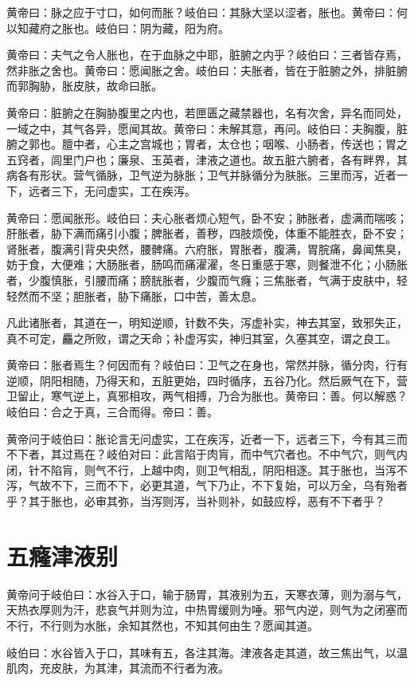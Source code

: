 \documentclass[a4paper,12pt,UTF8,twoside]{ctexbook}
\begin{document}
	黄帝曰：脉之应于寸口，如何而胀？岐伯曰：其脉大坚以涩者，胀也。黄帝曰：何以知藏府之胀也。岐伯曰：阴为藏，阳为府。
	
	黄帝曰：夫气之令人胀也，在于血脉之中耶，脏腑之内乎？岐伯曰：三者皆存焉，然非胀之舍也。黄帝曰：愿闻胀之舍。岐伯曰：夫胀者，皆在于脏腑之外，排脏腑而郭胸胁，胀皮肤，故命曰胀。
	
	黄帝曰：脏腑之在胸胁腹里之内也，若匣匮之藏禁器也，名有次舍，异名而同处，一域之中，其气各异，愿闻其故。黄帝曰：未解其意，再问。岐伯曰：夫胸腹，脏腑之郭也。膻中者，心主之宫城也；胃者，太仓也；咽喉、小肠者，传送也；胃之五窍者，闾里门户也；廉泉、玉英者，津液之道也。故五脏六腑者，各有畔界，其病各有形状。营气循脉，卫气逆为脉胀；卫气并脉循分为肤胀。三里而泻，近者一下，远者三下，无问虚实，工在疾泻。
	
	黄帝曰：愿闻胀形。岐伯曰：夫心胀者烦心短气，卧不安；肺胀者，虚满而喘咳；肝胀者，胁下满而痛引小腹；脾胀者，善秽，四肢烦俛，体重不能胜衣，卧不安；肾胀者，腹满引背央央然，腰髀痛。六府胀，胃胀者，腹满，胃脘痛，鼻闻焦臭，妨于食，大便难；大肠胀者，肠鸣而痛濯濯，冬日重感于寒，则餐泄不化；小肠胀者，少腹慎胀，引腰而痛；膀胱胀者，少腹而气癃；三焦胀者，气满于皮肤中，轻轻然而不坚；胆胀者，胁下痛胀，口中苦，善太息。
	
	凡此诸胀者，其道在一，明知逆顺，针数不失，泻虚补实，神去其室，致邪失正，真不可定，麤之所败，谓之天命；补虚泻实，神归其室，久塞其空，谓之良工。
	
	黄帝曰：胀者焉生？何因而有？岐伯曰：卫气之在身也，常然并脉，循分肉，行有逆顺，阴阳相随，乃得天和，五脏更始，四时循序，五谷乃化。然后厥气在下，营卫留止，寒气逆上，真邪相攻，两气相搏，乃合为胀也。黄帝曰：善。何以解惑？岐伯曰：合之于真，三合而得。帝曰：善。
	
	黄帝问于岐伯曰：胀论言无问虚实，工在疾泻，近者一下，远者三下，今有其三而不下者，其过焉在？岐伯对曰：此言陷于肉肓，而中气穴者也。不中气穴，则气内闭，针不陷肓，则气不行，上越中肉，则卫气相乱，阴阳相逐。其于胀也，当泻不泻，气故不下，三而不下，必更其道，气下乃止，不下复始，可以万全，乌有殆者乎？其于胀也，必审其弥，当泻则泻，当补则补，如鼓应桴，恶有不下者乎？
	\chapter{五癃津液别}
	
	黄帝问于岐伯曰：水谷入于口，输于肠胃，其液别为五，天寒衣薄，则为溺与气，天热衣厚则为汗，悲哀气并则为泣，中热胃缓则为唾。邪气内逆，则气为之闭塞而不行，不行则为水胀，余知其然也，不知其何由生？愿闻其道。
	
	岐伯曰：水谷皆入于口，其味有五，各注其海。津液各走其道，故三焦出气，以温肌肉，充皮肤，为其津，其流而不行者为液。
	
\end{document}
